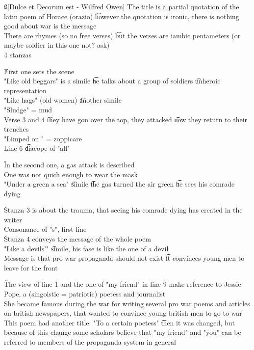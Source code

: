 \documentclass[12pt]{article}
\begin{document}
\ss[Dulce et Decorum est - Wilfred Owen]
The title is a partial quotation of the latin poem of Horace (orazio) \t however the quotation is ironic, there is nothing good about war is the message \\
There are rhymes (so no free verses) \t but the verses are iambic pentameters (or maybe soldier in this one not? ask) \\
4 stanzas

\v

First one sets the scene \\
"Like old beggars" is a simile \t he talks about a group of soldiers \t unheroic representation \\
"Like hags" (old women) \t another simile \\
"Sludge" = mud \\
Verse 3 and 4 \t they have gon over the top, they attacked \t now they return to their trenches \\
"Limped on " = zoppicare \\
Line 6 \t diacope of "all"

\v

In the second one, a gas attack is described \\
One was not quich enough to wear the mask \\
"Under a green a sea" \t simile \t the gas turned the air green \t he sees his comrade dying

\v

Stanza 3 is about the trauma, that seeing his comrade dying has created in the writer \\
Consonance of "s", first line \\

\v

Stanza 4 conveys the message of the whole poem \\
"Like a devils'" \t simile, his fase is like the one of a devil \\
Message is that pro war propaganda should not exist \t it convinces young men to leave for the front

\v

The view of line 1 and the one of "my friend" in line 9 make reference to Jessie Pope, a (singoistic = patriotic) poetess and journalist \\
She became famous during the war for writing several pro war poems and articles on british newspapers, that wanted to convince young british men to go to war \\
This poem had another title: "To a certain poetess" \t then it was changed, but because of this change some scholars believe that "my friend" and "you" can be referred to members of the propaganda system in general
\end{document}
